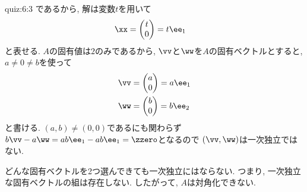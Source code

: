 \begin{answerof}{quiz:6:3}
  であるから, 解は変数$t$を用いて
  \begin{align*}
    \xx&=\begin{pmatrix}t\\0\end{pmatrix} =t\ee_1
  \end{align*}
  と表せる.
  $A$の固有値は$2$のみであるから,
  $\vv$と$\ww$を$A$の固有ベクトルとすると,
  $a\neq 0\neq b$を使って
  \begin{align*}
    \vv&=\begin{pmatrix}a\\0\end{pmatrix}=a\ee_1 \\
    \ww&=\begin{pmatrix}b\\0\end{pmatrix}=b\ee_2
  \end{align*}
  と書ける. $(a,b)\neq(0,0)$であるにも関わらず
  $b \vv-a\ww = ab\ee_1-ab\ee_1=\zzero$となるので
  $(\vv,\ww)$は一次独立ではない.

  どんな固有ベクトルを2つ選んできても一次独立にはならない.
  つまり, 一次独立な固有ベクトルの組は存在しない.
  したがって, $A$は対角化できない.
\end{answerof}


